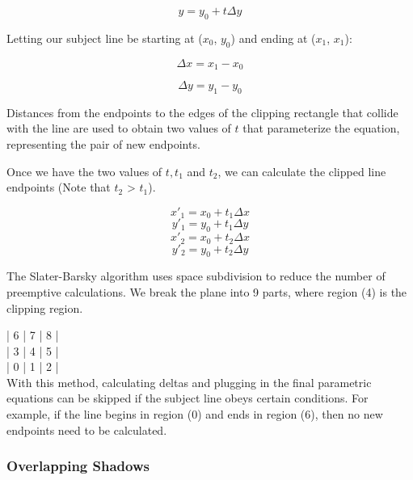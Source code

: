 \begin{equation}
y = y_0 + t \Delta y
\end{equation}

Letting our subject line be starting at ($x_0$, $y_0$) and ending at ($x_1$, $x_1$):

\begin{equation}
\Delta x = x_1 - x_0
\end{equation}

\begin{equation}
\Delta y = y_1 - y_0
\end{equation}

Distances from the endpoints to the edges of the clipping rectangle that collide with the line are used to obtain two values of $t$ that parameterize the equation, representing the pair of new endpoints.

Once we have the two values of $t, t_1$ and $t_2$, we can calculate the clipped line endpoints (Note that $t_2$ > $t_1$).

\begin{equation}
x'_1 = x_0 + t_1 \Delta x
\end{equation}
\begin{equation}
y'_1 = y_0 + t_1 \Delta y
\end{equation}
\begin{equation}
x'_2 = x_0 + t_2 \Delta x
\end{equation}
\begin{equation}
y'_2 = y_0 + t_2 \Delta y
\end{equation}

The Slater-Barsky algorithm uses space subdivision to reduce the number of preemptive calculations. We break the plane into 9 parts, where region (4) is the clipping region.


| 6 | 7 | 8 | \\
| 3 | 4 | 5 | \\
| 0 | 1 | 2 | \\


With this method, calculating deltas and plugging in the final parametric equations can be skipped if the subject line obeys certain conditions. For example, if the line begins in region (0) and ends in region (6), then no new endpoints need to be calculated.

\subsubsection{Overlapping Shadows}\label{overlapping-shadows}

